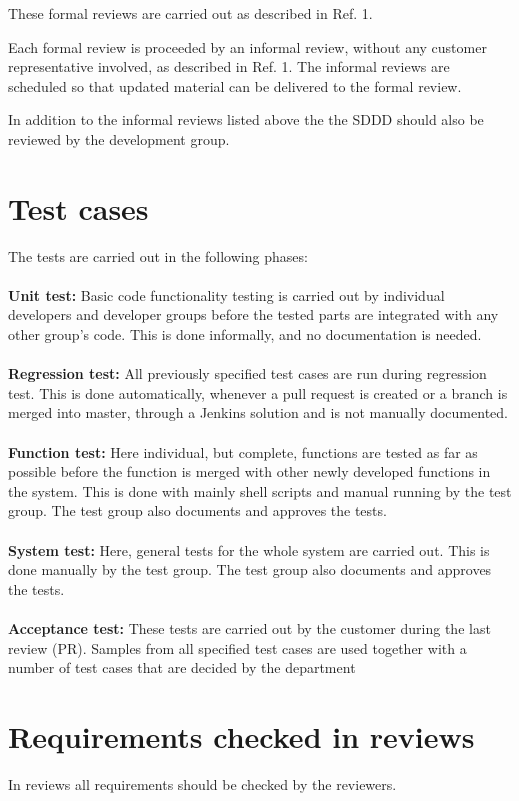 \documentclass{article}
\begin{document}
These formal reviews are carried out as described in Ref. 1.

Each formal review is proceeded by an informal review, without any customer
representative involved, as described in Ref. 1. The informal reviews are
scheduled so that updated material can be delivered to the formal review.

In addition to the informal reviews listed above the the SDDD should also
be reviewed by the development group.

\section{Test cases}
The tests are carried out in the following phases:\\\\
\textbf{Unit test:} Basic code functionality testing is carried out by individual developers and developer groups
before the tested parts are integrated with any other group’s code. This
is done informally, and no documentation is needed.\\\\
\textbf{Regression test:} All previously specified test cases are run during regression test. This is done automatically, whenever a pull request is created or a branch is merged into master, through a Jenkins solution and is not manually documented.\\\\
\textbf{Function test:} Here individual, but complete, functions are tested as far as
possible before the function is merged with other newly developed functions in the system. This is done with mainly shell scripts and manual running by the test group. The test group also documents and approves the tests.\\\\
\textbf{System test:} Here, general tests for the whole system are carried out. This is done manually by the test group. The test group also documents and approves the tests.\\\\
\textbf{Acceptance test:} These tests are carried out by the customer during the
last review (PR). Samples from all specified test cases are used together
with a number of test cases that are decided by the department
\section{ Requirements checked in reviews
}
In reviews all requirements should be checked by the reviewers.
\end{document}
